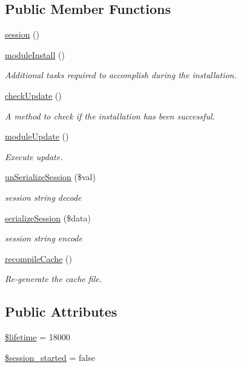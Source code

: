\subsection*{Public Member Functions}
\begin{DoxyCompactItemize}
\item 
\hyperlink{classsession_a96fce5e6e2f2f0504cb1b9b4906ba379}{session} ()
\item 
\hyperlink{classsession_af6b13ec50160d63aca04f689e5cac9dd}{module\+Install} ()
\begin{DoxyCompactList}\small\item\em Additional tasks required to accomplish during the installation. \end{DoxyCompactList}\item 
\hyperlink{classsession_a30f6cc95b00bd35757aa882abce7ac34}{check\+Update} ()
\begin{DoxyCompactList}\small\item\em A method to check if the installation has been successful. \end{DoxyCompactList}\item 
\hyperlink{classsession_ad1eb77a85d7765620658071e49d16cff}{module\+Update} ()
\begin{DoxyCompactList}\small\item\em Execute update. \end{DoxyCompactList}\item 
\hyperlink{classsession_a97462709868f87d6cb050956c7b7da6d}{un\+Serialize\+Session} (\$val)
\begin{DoxyCompactList}\small\item\em session string decode \end{DoxyCompactList}\item 
\hyperlink{classsession_aea7dba13f8bc60c916840c66b2bc28ba}{serialize\+Session} (\$data)
\begin{DoxyCompactList}\small\item\em session string encode \end{DoxyCompactList}\item 
\hyperlink{classsession_a08f5190f8867dc2c0d5c23435b236f15}{recompile\+Cache} ()
\begin{DoxyCompactList}\small\item\em Re-\/generate the cache file. \end{DoxyCompactList}\end{DoxyCompactItemize}
\subsection*{Public Attributes}
\begin{DoxyCompactItemize}
\item 
\hyperlink{classsession_af73b8d0d1528237504be7b85f05c97ed}{\$lifetime} = 18000
\item 
\hyperlink{classsession_aae3391920555707a71e14e15f2929825}{\$session\+\_\+started} = false
\end{DoxyCompactItemize}


